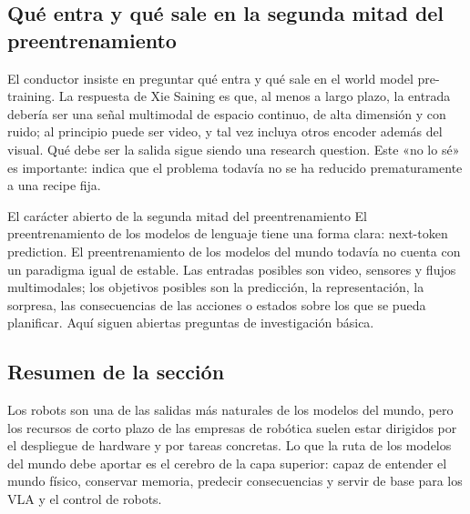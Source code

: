 \subsection{Qué entra y qué sale en la segunda mitad del preentrenamiento}

El conductor insiste en preguntar qué entra y qué sale en el world model pre-training. La respuesta de Xie Saining es que, al menos a largo plazo, la entrada debería ser una señal multimodal de espacio continuo, de alta dimensión y con ruido; al principio puede ser video, y tal vez incluya otros encoder además del visual. Qué debe ser la salida sigue siendo una research question. Este «no lo sé» es importante: indica que el problema todavía no se ha reducido prematuramente a una recipe fija.

\begin{importantbox}{El carácter abierto de la segunda mitad del preentrenamiento}
El preentrenamiento de los modelos de lenguaje tiene una forma clara: next-token prediction. El preentrenamiento de los modelos del mundo todavía no cuenta con un paradigma igual de estable. Las entradas posibles son video, sensores y flujos multimodales; los objetivos posibles son la predicción, la representación, la sorpresa, las consecuencias de las acciones o estados sobre los que se pueda planificar. Aquí siguen abiertas preguntas de investigación básica.
\end{importantbox}

\subsection{Resumen de la sección}

Los robots son una de las salidas más naturales de los modelos del mundo, pero los recursos de corto plazo de las empresas de robótica suelen estar dirigidos por el despliegue de hardware y por tareas concretas. Lo que la ruta de los modelos del mundo debe aportar es el cerebro de la capa superior: capaz de entender el mundo físico, conservar memoria, predecir consecuencias y servir de base para los VLA y el control de robots.
